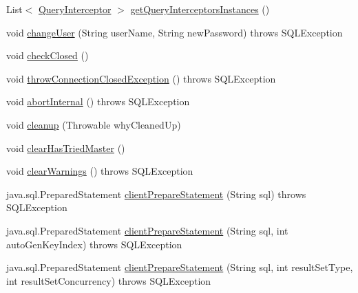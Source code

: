 \begin{DoxyCompactItemize}
\item 
List$<$ \mbox{\hyperlink{interfacecom_1_1mysql_1_1cj_1_1interceptors_1_1_query_interceptor}{Query\+Interceptor}} $>$ \mbox{\hyperlink{classcom_1_1mysql_1_1cj_1_1jdbc_1_1_connection_impl_ac2c88b4ff05ae8dbed8e5ce3e79ad423}{get\+Query\+Interceptors\+Instances}} ()
\item 
void \mbox{\hyperlink{classcom_1_1mysql_1_1cj_1_1jdbc_1_1_connection_impl_a124604d3aae705d3e14bc1deb6a3f9a9}{change\+User}} (String user\+Name, String new\+Password)  throws S\+Q\+L\+Exception 
\item 
void \mbox{\hyperlink{classcom_1_1mysql_1_1cj_1_1jdbc_1_1_connection_impl_a33d9303b2ac912fc285f5c2215d568d1}{check\+Closed}} ()
\item 
void \mbox{\hyperlink{classcom_1_1mysql_1_1cj_1_1jdbc_1_1_connection_impl_a65ad37d81e0865583f7896c058f7eb9f}{throw\+Connection\+Closed\+Exception}} ()  throws S\+Q\+L\+Exception 
\item 
void \mbox{\hyperlink{classcom_1_1mysql_1_1cj_1_1jdbc_1_1_connection_impl_a39a1f63273b1ccd8e4baf30f1f6955a9}{abort\+Internal}} ()  throws S\+Q\+L\+Exception 
\item 
void \mbox{\hyperlink{classcom_1_1mysql_1_1cj_1_1jdbc_1_1_connection_impl_ac72cb58dc4f2b002b1882b69815cc64b}{cleanup}} (Throwable why\+Cleaned\+Up)
\item 
void \mbox{\hyperlink{classcom_1_1mysql_1_1cj_1_1jdbc_1_1_connection_impl_ac4217c85e8137986c58604454de14cfd}{clear\+Has\+Tried\+Master}} ()
\item 
void \mbox{\hyperlink{classcom_1_1mysql_1_1cj_1_1jdbc_1_1_connection_impl_a5f8f37e6f8b36663bae849559cc89afa}{clear\+Warnings}} ()  throws S\+Q\+L\+Exception 
\item 
java.\+sql.\+Prepared\+Statement \mbox{\hyperlink{classcom_1_1mysql_1_1cj_1_1jdbc_1_1_connection_impl_a97fe5e29bb844493eb31b4f1c48d8bc7}{client\+Prepare\+Statement}} (String sql)  throws S\+Q\+L\+Exception 
\item 
java.\+sql.\+Prepared\+Statement \mbox{\hyperlink{classcom_1_1mysql_1_1cj_1_1jdbc_1_1_connection_impl_ac15baa66a2fe559cb558a0afd9c7cc03}{client\+Prepare\+Statement}} (String sql, int auto\+Gen\+Key\+Index)  throws S\+Q\+L\+Exception 
\item 
java.\+sql.\+Prepared\+Statement \mbox{\hyperlink{classcom_1_1mysql_1_1cj_1_1jdbc_1_1_connection_impl_a08e44e57c6c4a70f6d4ea9a71b612b0e}{client\+Prepare\+Statement}} (String sql, int result\+Set\+Type, int result\+Set\+Concurrency)  throws S\+Q\+L\+Exception 
\item 

\end{DoxyCompactItemize}
